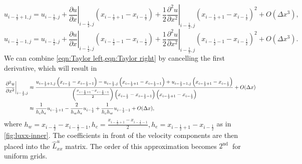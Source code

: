 \documentclass{article}
\numberwithin{equation}{section}
\begin{document}
\begin{equation}\label{eqn:Taylor right} 
	u_{i-\frac{1}{2}+1,j}=u_{i-\frac{1}{2},j}+\left.\frac{\partial u}{\partial x}\right|_{i-\frac{1}{2},j}\left(x_{i-\frac{1}{2}+1}-x_{i-\frac{1}{2}}\right)+\frac{1}{2}\left.\frac{\partial^2 u}{\partial x^2}\right|_{i-\frac{1}{2},j}\left(x_{i-\frac{1}{2}+1}-x_{i-\frac{1}{2}}\right)^2+O\left(\Delta x^3\right),
\end{equation}
\begin{equation}\label{eqn:Taylor left} 
	u_{i-\frac{1}{2}-1,j}=u_{i-\frac{1}{2},j}+\left.\frac{\partial u}{\partial x}\right|_{i-\frac{1}{2},j}\left(x_{i-\frac{1}{2}-1}-x_{i-\frac{1}{2}}\right)+\frac{1}{2}\left.\frac{\partial^2 u}{\partial x^2}\right|_{i-\frac{1}{2},j}\left(x_{i-\frac{1}{2}-1}-x_{i-\frac{1}{2}}\right)^2+O\left(\Delta x^3\right).
\end{equation}
We can combine \cref{eqn:Taylor left,eqn:Taylor right} by cancelling the first derivative, which will result in
\begin{align}\label{eqn:laplacian-discretization-non-uniform-dx}
\left.\frac{\partial^2 u}{\partial x^2}\right|_{i-\frac{1}{2},j} & \approx \frac{u_{i-\frac{1}{2}+1,j}\left(x_{i-\frac{1}{2}}-x_{i-\frac{1}{2}-1}\right)-u_{i-\frac{1}{2},j}\left(x_{i-\frac{1}{2}+1}-x_{i-\frac{1}{2}-1}\right)+u_{i-\frac{1}{2}-1,j}\left(x_{i-\frac{1}{2}+1}-x_{i-\frac{1}{2}}\right)}{\left(\frac{x_{i-\frac{1}{2}+1}-x_{i-\frac{1}{2}-1}}{2}\right)\left(x_{i-\frac{1}{2}}-x_{i-\frac{1}{2}-1}\right)\left(x_{i-\frac{1}{2}+1}-x_{i-\frac{1}{2}}\right)}+O(\Delta x)\notag\\
& \approx \frac{1}{h_c h_e}u_{i-\frac{1}{2}+1} - \frac{2}{h_w h_e}u_{i-\frac{1}{2}} + \frac{1}{h_c h_w}u_{i-\frac{1}{2}-1} + O(\Delta x),
\end{align}
where $h_w=x_{i-\frac{1}{2}}-x_{i-\frac{1}{2}-1},h_c = \frac{x_{i-\frac{1}{2}+1}-x_{i-\frac{1}{2}-1}}{2}, h_e = x_{i-\frac{1}{2}+1}-x_{i-\frac{1}{2}}$ as in \cref{fig:luxx-inner}. The coefficients in front of the velocity components are then placed into the $\hat{L}^u_{xx}$ matrix. The order of this approximation becomes $2^{\text {nd }}$ for uniform grids. 
\end{document}
